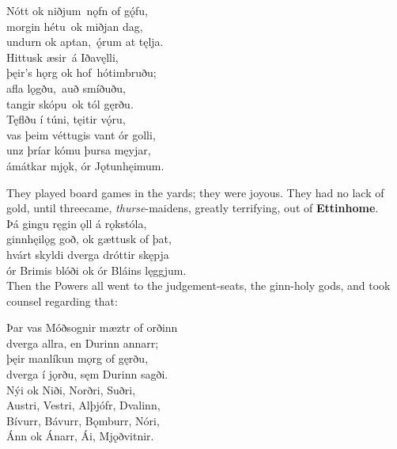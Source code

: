 \bva Nótt ok niðjum \hld nǫfn of gǫ́fu, \\%
morgin hétu \hld ok miðjan dag, \\%
undurn ok aptan, \hld ǫ́rum at tęlja.\footnotemark[22]
\\%

\bva Hittusk æsir \hld á Iðavęlli, \\%
þęir's hǫrg ok hof \hld hótimbruðu; \\%
afla lǫgðu, \hld auð smíðuðu, \\%
tangir skópu \hld ok tól gęrðu.\\%

\bva Tęflðu í túni, \hld tęitir vǫ́ru, \\%
vas þeim véttugis \hld vant ór golli, \\%
unz þríar kómu \hld þursa męyjar, \\%
ámátkar mjǫk, \hld ór Jǫtunhęimum.

\bvb They played board games in the yards; they were joyous. They had no lack of gold, until three\footnotemark[21] came, \emph{thurse}-maidens, greatly terrifying, out of \textbf{Ettinhome}.
\\%

\bva Þá gingu ręgin ǫll \hld á rǫkstóla, \\%
ginnhęilǫg goð, \hld ok gættusk of þat, \\%
hvárt skyldi dverga \hld dróttir skępja \\%
ór Brimis blóði \hld ok ór Bláins lęggjum.\footnotemark[22]
\\%

\bvb Then the Powers all went to the judgement-seats, the ginn-holy gods, and took counsel regarding that:

\bva Þar vas Móðsognir \hld mæztr of orðinn \\%
dverga allra, \hld en Durinn annarr; \\%
þęir manlíkun \hld mǫrg of gęrðu, \\%
dverga í jǫrðu, \hld sęm Durinn sagði.\\%

\bva Nýi ok Niði, \hld Norðri, Suðri, \\%
Austri, Vestri, \hld Alþjófr, Dvalinn, \\%
Bívurr, Bávurr, \hld Bǫmburr, Nóri, \\%
Ánn ok Ánarr, \hld Ái, Mjǫðvitnir.\\%

